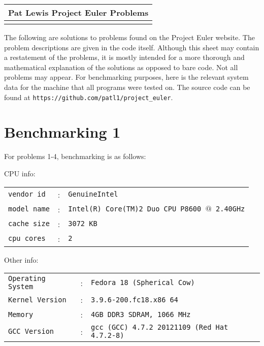 \documentclass{article}
\begin{document}
\begin{table}
\setlength{\extrarowheight}{4pt}
\begin{tabularx}{\textwidth}{ X }
\hline
{\textbf{Pat Lewis}} \hfill {\textbf{Project Euler Problems}}\\
\hline\\
\end{tabularx}
\end{table}

The following are solutions to problems found on the Project Euler website. The problem 
descriptions are given in the code itself. Although this sheet may contain a restatement of 
the problems, it is mostly intended for a more thorough and mathematical explanation of the 
solutions as opposed to bare code. Not all problems may appear. For benchmarking purposes, 
here is the relevant system data for the machine that all programs were tested on. The source 
code can be found at \texttt{https://github.com/patl1/project\_euler}.

\section*{Benchmarking 1}
For problems 1-4, benchmarking is as follows:

\medskip

\noindent CPU info:

\begin{tabular}{lcl}
\texttt{vendor id} 	& : & \texttt{GenuineIntel}									\\
\texttt{model name}	& : & \texttt{Intel(R) Core(TM)2 Duo CPU P8600 $@$ 2.40GHz}	\\
\texttt{cache size}	& : & \texttt{3072 KB}										\\
\texttt{cpu cores}	& : & \texttt{2}
\end{tabular}

\noindent Other info:

\begin{tabular}{lcl}
\texttt{Operating System}	& : & \texttt{Fedora 18 (Spherical Cow)}					\\
\texttt{Kernel Version}		& : & \texttt{3.9.6-200.fc18.x86 64}						\\
\texttt{Memory}				& : & \texttt{4GB DDR3 SDRAM, 1066 MHz}						\\
\texttt{GCC Version}			& : & \texttt{gcc (GCC) 4.7.2 20121109 (Red Hat 4.7.2-8)}	\\
\end{tabular}
\end{document}
